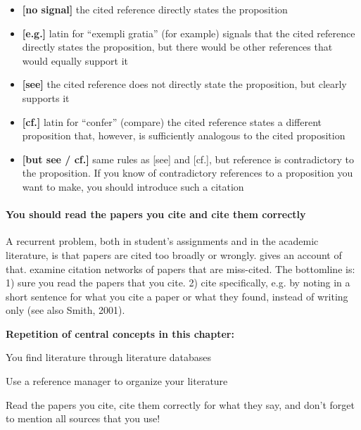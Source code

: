\documentclass{tufte-book}
\begin{document}
\begin{itemize}
  \item \textbf{[no signal]} the cited reference directly states the proposition
  \item \textbf{[e.g.]} latin for ``exempli gratia'' (for example) signals that the cited reference directly states the proposition, but there would be other references that would equally support it
  \item \textbf{[see]} the cited reference does not directly state the proposition, but clearly supports it
  \item \textbf{[cf.]} latin for ``confer'' (compare) the cited reference states a different proposition that, however, is sufficiently analogous to the cited proposition
  \item \textbf{[but see / cf.]} same rules as [see] and [cf.], but reference is contradictory to the proposition. If you know of contradictory references to a proposition you want to make, you should introduce such a citation
\end{itemize}

\paragraph{You should read the papers you cite and cite them correctly} A recurrent problem, both in student's assignments and in the academic literature, is that papers are cited too broadly or wrongly. \citet{Editorial-Causecorrelationconjecture-2015} gives an account of that. \citet{Greenberg-Howcitationdistortions-2009} examine citation networks of papers that are miss-cited. The bottomline is: 1) sure you read the papers that you cite. 2) cite specifically, e.g. by noting in a short sentence for what you cite a paper or what they found, instead of writing only (see also Smith, 2001). 

\vspace{1cm}
\begin{mdframed}[backgroundcolor=black!10,rightline=false,leftline=false]
    
\textbf{Repetition of central concepts in this chapter:} 

\begin{itemize*}
  \item You find literature through literature databases
  \item Use a reference manager to organize your literature
  \item Read the papers you cite, cite them correctly for what they say, and don't forget to mention all sources that you use!
\end{itemize*}

\end{mdframed}
\end{document}
